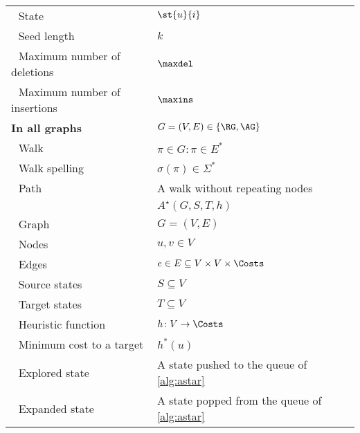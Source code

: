 \begin{table}[!h]
\begin{tabular}{ll}
	\,\, State& $\st{u}{i}$\\
	\,\, Seed length& $k$\\
	\,\, Maximum number of deletions& $\maxdel$\\
	\,\, Maximum number of insertions& $\maxins$\\
	\hline
	\textbf{In all graphs}& $G = (V,E) \in \{ \RG, \AG \}$ \\
	\,\, Walk& $\pi \in G: \pi \in E^*$\\
	\,\, Walk spelling& $\sigma(\pi) \in \Sigma^*$\\
	\,\, Path& A walk without repeating nodes\\
	\hline
	\textbf{\A} & $A^\star(G,S,T,h)$\\
	\,\, Graph& $G=(V,E)$\\
	\,\, Nodes& $u,v \in V$\\
	\,\, Edges& $e \in E \subseteq V \times V \times \Costs$\\ 
	\,\, Source states& $S \subseteq V$\\
	\,\, Target states& $T \subseteq V$\\
	\,\, Heuristic function& $h \colon V \to \Costs$\\
	\,\, Minimum cost to a target& $h^*(u)$\\
	\,\, Explored state & A state pushed to the queue of \cref{alg:astar}\\
	\,\, Expanded state & A state popped from the queue of \cref{alg:astar}\\
	\hline
\end{tabular}
\end{table}